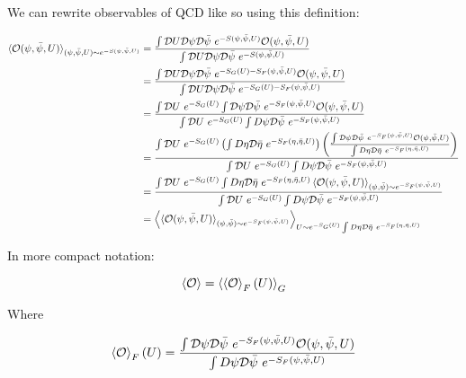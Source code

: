 \documentclass[11pt]{article}
\begin{document}
We can rewrite observables of QCD like so using this definition:

\begin{align*}\braket{\mathcal O(\psi,\bar\psi,U)}_{(\psi,\bar\psi,U)\sim e^{-S(\psi,\bar\psi,U)}}
&=\frac{\int\mathcal DU\mathcal D\psi\mathcal D\bar\psi\ e^{-S(\psi,\bar\psi,U)}\mathcal O(\psi,\bar\psi,U)}{\int\mathcal DU\mathcal D\psi\mathcal D\bar\psi\ e^{-S(\psi,\bar\psi,U)}}\\
&=\frac{\int\mathcal DU\mathcal D\psi\mathcal D\bar\psi\ e^{-S_G(U)-S_F(\psi,\bar\psi,U)}\mathcal O(\psi,\bar\psi,U)}{\int\mathcal DU\mathcal D\psi\mathcal D\bar\psi\ e^{-S_G(U)-S_F(\psi,\bar\psi,U)}}\\
&=\frac{\int\mathcal DU\ e^{-S_G(U)}\int\mathcal D\psi\mathcal D\bar\psi\ e^{-S_F(\psi,\bar\psi,U)}\mathcal O(\psi,\bar\psi,U)}{\int\mathcal DU\mathcal\ e^{-S_G(U)}\int D\psi\mathcal D\bar\psi\ e^{-S_F(\psi,\bar\psi,U)}}\\
&=\frac{\int\mathcal DU\ e^{-S_G(U)}\left(\int D\eta\mathcal D\bar\eta\ e^{-S_F(\eta,\bar\eta,U)}\right)\left(\frac{\int\mathcal D\psi\mathcal D\bar\psi\ e^{-S_F(\psi,\bar\psi,U)}\mathcal O(\psi,\bar\psi,U)}{\int D\eta\mathcal D\bar\eta\ e^{-S_F(\eta,\bar\eta,U)}}\right)}{\int\mathcal DU\mathcal\ e^{-S_G(U)}\int D\psi\mathcal D\bar\psi\ e^{-S_F(\psi,\bar\psi,U)}}\\
&=\frac{\int\mathcal DU\ e^{-S_G(U)}\int D\eta\mathcal D\bar\eta\ e^{-S_F(\eta,\bar\eta,U)}\braket{\mathcal O(\psi,\bar\psi,U)}_{(\psi,\bar\psi)\sim e^{-S_F(\psi,\bar\psi,U)}}}{\int\mathcal DU\mathcal\ e^{-S_G(U)}\int D\psi\mathcal D\bar\psi\ e^{-S_F(\psi,\bar\psi,U)}}\\
&=\Braket{\braket{\mathcal O(\psi,\bar\psi,U)}_{(\psi,\bar\psi)\sim e^{-S_F(\psi,\bar\psi,U)}}}_{U\sim e^{-S_G(U)}\int D\eta\mathcal D\bar\eta\ e^{-S_F(\eta,\bar\eta,U)}}\end{align*}

In more compact notation:

\begin{equation}\braket{\mathcal O}=\braket{\braket {\mathcal O}_F(U)}_G\end{equation}

Where

\begin{equation}\braket{\mathcal O}_F(U)=\frac{\int\mathcal D\psi\mathcal D\bar\psi\ e^{-S_F(\psi,\bar\psi,U)}\mathcal O(\psi,\bar\psi,U)}{\int D\psi\mathcal D\bar\psi\ e^{-S_F(\psi,\bar\psi,U)}}\end{equation}
\end{document}
